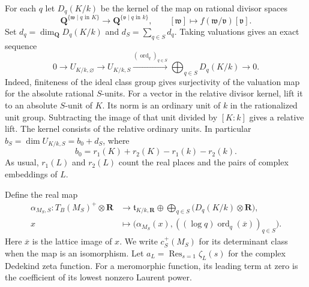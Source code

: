 \documentclass[11pt]{amsart}
\numberwithin{equation}{section}
\theoremstyle{definition}
\theoremstyle{remark}
\newcommand{\Q}{\mathbf Q}
\newcommand{\R}{\mathbf R}
\newcommand{\ord}{\operatorname{ord}}
\begin{document}
For each $q$ let $D_q(K/k)$ be the kernel of the map on
rational divisor spaces
\begin{equation}\label{eq:divnorm}
 \Q^{\{\mathfrak w\mid q\text{ in }K\}}
 \longrightarrow \Q^{\{\mathfrak v\mid q\text{ in }k\}},
 \qquad [\mathfrak w]\longmapsto
 f(\mathfrak w/\mathfrak v)[\mathfrak v].
\end{equation}
Set $d_q=\dim_\Q D_q(K/k)$ and $d_S=\sum_{q\in S}d_q$.
Taking valuations gives an exact sequence
\begin{equation}\label{eq:sunitseq}
 0\longrightarrow U_{K/k,\varnothing}
 \longrightarrow U_{K/k,S}
 \xrightarrow{(\ord_q)_{q\in S}}
 \bigoplus_{q\in S}D_q(K/k)\longrightarrow0 .
\end{equation}
Indeed, finiteness of the ideal class group gives
surjectivity of the valuation map for the absolute rational
$S$-units. For a vector in the relative divisor kernel,
lift it to an absolute $S$-unit of $K$. Its norm is an
ordinary unit of $k$ in the rationalized unit group.
Subtracting the image of that unit divided by $[K:k]$
gives a relative lift. The kernel consists of the
relative ordinary units. In particular
$b_S=\dim U_{K/k,S}=b_0+d_S$, where
\[
 b_0=r_1(K)+r_2(K)-r_1(k)-r_2(k).
\]
As usual, $r_1(L)$ and $r_2(L)$ count the real places and the
pairs of complex embeddings of $L$.

Define the real map
\begin{equation}\label{eq:augreal}
 \begin{split}
 \alpha_{M_S,S}:T_B(M_S)^+\otimes\R
 &\longrightarrow \mathfrak t_{K/k,\R}
       \oplus\bigoplus_{q\in S}\bigl(D_q(K/k)\otimes\R\bigr),\\
 x&\longmapsto \bigl(\alpha_{M_S}(x),
       ((\log q)\ord_q(\overline{x}))_{q\in S}\bigr).
 \end{split}
\end{equation}
Here $\overline{x}$ is the lattice image of $x$. We write
$c_S^+(M_S)$ for its determinant class when the map is an
isomorphism. Let $a_L=\operatorname{Res}_{s=1}\zeta_L(s)$
for the complex Dedekind zeta function. For a meromorphic
function, its leading term at zero is the coefficient of its
lowest nonzero Laurent power.
\end{document}
